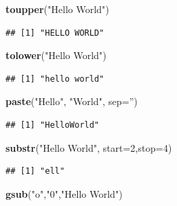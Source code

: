 \documentclass[]{book}
\newenvironment{Shaded}{\begin{snugshade}}{\end{snugshade}}
\newcommand{\KeywordTok}[1]{\textcolor[rgb]{0.13,0.29,0.53}{\textbf{{#1}}}}
\newcommand{\DataTypeTok}[1]{\textcolor[rgb]{0.13,0.29,0.53}{{#1}}}
\newcommand{\DecValTok}[1]{\textcolor[rgb]{0.00,0.00,0.81}{{#1}}}
\newcommand{\StringTok}[1]{\textcolor[rgb]{0.31,0.60,0.02}{{#1}}}
\newcommand{\NormalTok}[1]{{#1}}
\theoremstyle{definition}
\theoremstyle{definition}
\theoremstyle{remark}
\begin{document}
\begin{Shaded}
\begin{Highlighting}[]
\KeywordTok{toupper}\NormalTok{(}\StringTok{"Hello World"}\NormalTok{)}
\end{Highlighting}
\end{Shaded}

\begin{verbatim}
## [1] "HELLO WORLD"
\end{verbatim}

\begin{Shaded}
\begin{Highlighting}[]
\KeywordTok{tolower}\NormalTok{(}\StringTok{"Hello World"}\NormalTok{)}
\end{Highlighting}
\end{Shaded}

\begin{verbatim}
## [1] "hello world"
\end{verbatim}

\begin{Shaded}
\begin{Highlighting}[]
\KeywordTok{paste}\NormalTok{(}\StringTok{"Hello"}\NormalTok{, }\StringTok{"World"}\NormalTok{, }\DataTypeTok{sep=}\StringTok{''}\NormalTok{)}
\end{Highlighting}
\end{Shaded}

\begin{verbatim}
## [1] "HelloWorld"
\end{verbatim}

\begin{Shaded}
\begin{Highlighting}[]
\KeywordTok{substr}\NormalTok{(}\StringTok{"Hello World"}\NormalTok{, }\DataTypeTok{start=}\DecValTok{2}\NormalTok{,}\DataTypeTok{stop=}\DecValTok{4}\NormalTok{)}
\end{Highlighting}
\end{Shaded}

\begin{verbatim}
## [1] "ell"
\end{verbatim}

\begin{Shaded}
\begin{Highlighting}[]
\KeywordTok{gsub}\NormalTok{(}\StringTok{"o"}\NormalTok{,}\StringTok{"0"}\NormalTok{,}\StringTok{"Hello World"}\NormalTok{)}
\end{Highlighting}
\end{Shaded}
\end{document}
